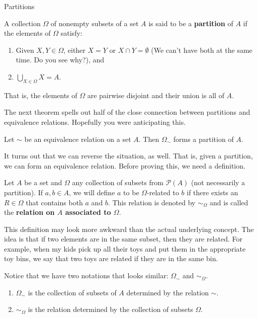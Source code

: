 \begin{section}{Partitions}

\begin{definition}
A collection $\Omega$ of nonempty subsets of a set $A$ is said to be a \textbf{partition} of $A$ if the elements of $\Omega$ satisfy:
\begin{enumerate}
\item Given $X,Y\in\Omega$, either $X=Y$ or $X\cap Y=\emptyset$ (We can't have both at the same time. Do you see why?), and
\item $\displaystyle \bigcup_{X\in\Omega}X=A$.
\end{enumerate}
That is, the elements of $\Omega$ are pairwise disjoint and their union is all of $A$.
\end{definition}

The next theorem spells out half of the close connection between partitions and equivalence relations.  Hopefully you were anticipating this.

\begin{theorem}
Let $\sim$ be an equivalence relation on a set $A$.  Then $\Omega_{\sim}$ forms a partition of $A$.
\end{theorem}

It turns out that we can reverse the situation, as well.  That is, given a partition, we can form an equivalence relation.  Before proving this, we need a definition.

\begin{definition}
Let $A$ be a set and $\Omega$ any collection of subsets from $\mathcal{P}(A)$ (not necessarily a partition).  If $a,b\in A$, we will define $a$ to be $\Omega$-related to $b$ if there exists an $R\in \Omega$ that contains both $a$ and $b$.  This relation is denoted by $\sim_{\Omega}$ and is called the \textbf{relation on $A$ associated to $\Omega$}.
\end{definition}

\begin{remark}
This definition may look more awkward than the actual underlying concept.  The idea is that if two elements are in the same subset, then they are related.  For example, when my kids pick up all their toys and put them in the appropriate toy bins, we say that two toys are related if they are in the same bin.
\end{remark}

\begin{remark}
Notice that we have two notations that looks similar: $\Omega_{\sim}$ and $\sim_{\Omega}$.  
\begin{enumerate}
\item $\Omega_{\sim}$ is the collection of subsets of $A$ determined by the relation $\sim$.
\item $\sim_{\Omega}$ is the relation determined by the collection of subsets $\Omega$.
\end{enumerate}
\end{remark}


\end{section}
